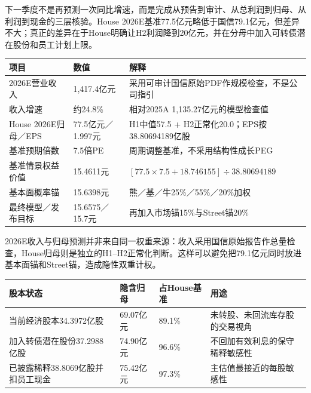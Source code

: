 下一季度不是再预测一次同比增速，而是完成从预告到审计、从总利润到归母、从利润到现金的三层核验。House 2026E基准77.5亿元略低于国信79.1亿元，但差异不大；真正的差异在于House明确让H2利润降到20亿元，并在分母中加入可转债潜在股份和员工计划上限。

\begin{exhibitbox}
\noindent\begin{tabularx}{\textwidth}{L{3.7cm}R{2.1cm}X}
\toprule
\textbf{项目} & \textbf{数值} & \textbf{解释} \\
\midrule
2026E营业收入 & 1,417.4亿元 & 采用可审计国信原始PDF作规模检查，不是公司指引 \\
收入增速 & 约24.8\% & 相对2025A 1,135.27亿元的模型检查值 \\
House 2026E归母／EPS & 77.5亿元／1.997元 & H1中值57.5 + H2正常化20.0；EPS按38.80694189亿股 \\
基准预期倍数 & 7.5倍PE & 周期调整基准，不采用结构性成长PEG \\
基准情景权益价值 & 15.4611元 & $[77.5\times7.5+18.746155]\div38.80694189$ \\
基本面概率锚 & 15.6398元 & 熊／基／牛25\%／55\%／20\%加权 \\
最终模型／发布目标 & 15.6575／15.7元 & 再加入市场锚15\%与Street锚20\% \\
\bottomrule
\end{tabularx}
\end{exhibitbox}

2026E收入与归母预测并非来自同一权重来源：收入采用国信原始报告作总量检查，House归母则是独立的H1--H2正常化判断。这样可以避免把79.1亿元同时放进基本面锚和Street锚，造成隐性双重计权。

\begin{exhibitbox}
\noindent\begin{tabularx}{\textwidth}{L{4.1cm}R{2.0cm}R{2.0cm}X}
\toprule
\textbf{股本状态} & \textbf{隐含归母} & \textbf{占House基准} & \textbf{用途} \\
\midrule
当前经济股本34.3972亿股 & 69.07亿元 & 89.1\% & 未转股、未回流库存股的交易视角 \\
加入转债潜在股份37.2988亿股 & 74.90亿元 & 96.6\% & 不回加有效利息的保守稀释敏感性 \\
已披露稀释38.8069亿股并扣员工现金 & 75.42亿元 & 97.3\% & 主估值最接近的每股敏感性 \\
\bottomrule
\end{tabularx}
\end{exhibitbox}

